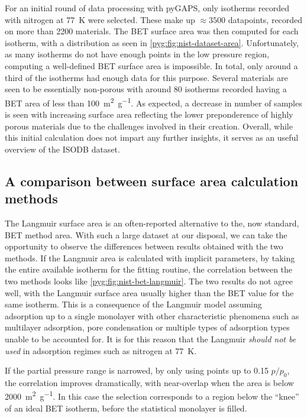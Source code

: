 For an initial round of data processing with pyGAPS,
only isotherms recorded with nitrogen at \SI{77}{\kelvin}
were selected. These make up \(\approx \! 3500\) datapoints,
recorded on more than 2200 materials. The BET surface area
was then computed for each isotherm, with a distribution
as seen in \autoref{pyg:fig:nist-dataset-area}.
Unfortunately, as many isotherms do not have enough points
in the low pressure region, computing a well-defined
BET surface area is impossible. In total, only around a
third of the isotherms had enough data for this purpose.
Several materials are seen to be essentially non-porous
with around 80 isotherms recorded having a BET area of less
than \SI{100}{\metre^2\per\gram}. As expected, a decrease in
number of samples is seen with increasing surface area
reflecting the lower preponderence of highly porous
materials due to the challenges involved in their
creation. Overall, while this initial calculation does
not impart any further insights, it serves as an useful overview
of the ISODB dataset.

\subsection{A comparison between surface area calculation methods}

The Langmuir surface area is an often-reported alternative
to the, now standard, BET method area.
With such a large dataset at our disposal, we can take
the opportunity to observe the differences between results
obtained with the two methods.
If the Langmuir area is calculated with implicit parameters,
by taking the entire available isotherm for the fitting
routine, the correlation between the two methods looks
like \autoref{pyg:fig:nist-bet-langmuir}. The two results
do not agree well, with the Langmuir surface
area usually higher than the BET value for the
same isotherm. This is a consequence of the Langmuir model
assuming adsorption up to a single monolayer with other
characteristic phenomena such as multilayer adsorption,
pore condensation or multiple types of adsorption types
unable to be accounted for. It is for this reason that the 
Langmuir \textit{should not be used} in adsorption regimes 
such as nitrogen at \SI{77}{\kelvin}.

If the partial pressure range is narrowed, by only using
points up to 0.15 \(p/p_0\), the correlation improves
dramatically, with near-overlap when the area is below
\SI{2000}{\metre^2\per\gram}. In this case the selection corresponds
to a region below the ``knee'' of an ideal BET isotherm,
before the statistical monolayer is filled.

